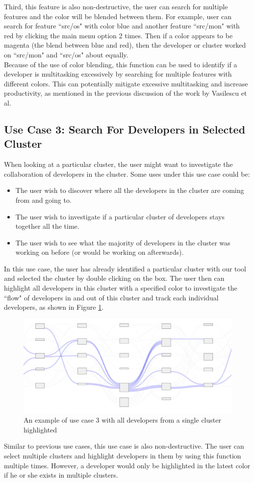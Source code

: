 \documentclass{article}
\begin{document}
Third, this feature is also non-destructive, the user can search for multiple features and the color will be blended between them. For example, user can search for feature ``src/os" with color blue and another feature ``src/mon" with red by clicking the main menu option 2 times. Then if a color appears to be magenta (the blend between blue and red), then the developer or cluster worked on ``src/mon" and ``src/os" about equally.\\ 
Because of the use of color blending, this function can be used to identify if a developer is multitasking excessively by searching for multiple features with different colors. This can potentially mitigate excessive multitasking and increase productivity, as mentioned in the previous discussion of the work by Vasilescu et al\citep{vasilescu2016sky}.
\subsection{Use Case 3: Search For Developers in Selected Cluster}
When looking at a particular cluster, the user might want to investigate the collaboration of developers in the cluster. Some uses under this use case could be:
\begin{itemize}
    \item The user wish to discover where all the developers in the cluster are coming from and going to. 
    \item The user wish to investigate if a particular cluster of developers stays together all the time.
    \item The user wish to see what the majority of developers in the cluster was working on before (or would be working on afterwards).
\end{itemize}
In this use case, the user has already identified a particular cluster with our tool and selected the cluster by double clicking on the box. The user then can highlight all developers in this cluster with a specified color to investigate the ``flow" of developers in and out of this cluster and track each individual developers, as shown in Figure \ref{fig:usecase3}.
\begin{figure}[h!]
\centering
\includegraphics[scale=0.5]{images/usecase3.JPG}
\caption{An example of use case 3 with all developers from a single cluster highlighted}
\label{fig:usecase3}
\end{figure}
Similar to previous use cases, this use case is also non-destructive. The user can select multiple clusters and highlight developers in them by using this function multiple times. However, a developer would only be highlighted in the latest color if he or she exists in multiple clusters.
\end{document}
